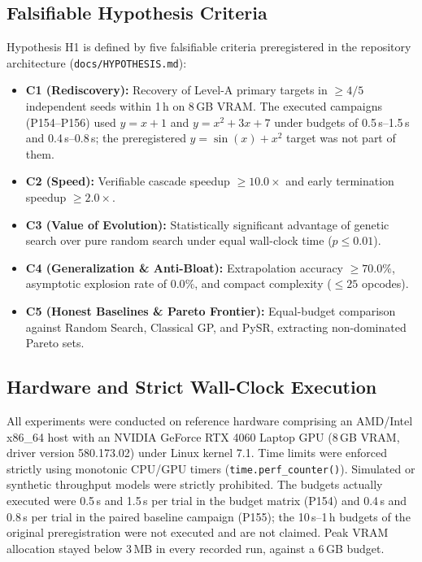 \documentclass[11pt,a4paper]{article}
\begin{document}
\subsection{Falsifiable Hypothesis Criteria}
Hypothesis H1 is defined by five falsifiable criteria preregistered in the repository architecture (\texttt{docs/HYPOTHESIS.md}):
\begin{itemize}
    \item \textbf{C1 (Rediscovery):} Recovery of Level-A primary targets in $\ge 4/5$ independent seeds within 1\,h on 8\,GB VRAM. The executed campaigns (P154--P156) used $y = x+1$ and $y = x^2+3x+7$ under budgets of 0.5\,s--1.5\,s and 0.4\,s--0.8\,s; the preregistered $y = \sin(x) + x^2$ target was not part of them.
    \item \textbf{C2 (Speed):} Verifiable cascade speedup $\ge 10.0\times$ and early termination speedup $\ge 2.0\times$.
    \item \textbf{C3 (Value of Evolution):} Statistically significant advantage of genetic search over pure random search under equal wall-clock time ($p \le 0.01$).
    \item \textbf{C4 (Generalization \& Anti-Bloat):} Extrapolation accuracy $\ge 70.0\%$, asymptotic explosion rate of $0.0\%$, and compact complexity ($\le 25$ opcodes).
    \item \textbf{C5 (Honest Baselines \& Pareto Frontier):} Equal-budget comparison against Random Search, Classical GP, and PySR, extracting non-dominated Pareto sets.
\end{itemize}

\subsection{Hardware and Strict Wall-Clock Execution}
All experiments were conducted on reference hardware comprising an AMD/Intel x86\_64 host with an NVIDIA GeForce RTX 4060 Laptop GPU (8\,GB VRAM, driver version 580.173.02) under Linux kernel 7.1. Time limits were enforced strictly using monotonic CPU/GPU timers (\texttt{time.perf\_counter()}). Simulated or synthetic throughput models were strictly prohibited. The budgets actually executed were 0.5\,s and 1.5\,s per trial in the budget matrix (P154) and 0.4\,s and 0.8\,s per trial in the paired baseline campaign (P155); the 10\,s--1\,h budgets of the original preregistration were not executed and are not claimed. Peak VRAM allocation stayed below 3\,MB in every recorded run, against a 6\,GB budget.


\end{document}
